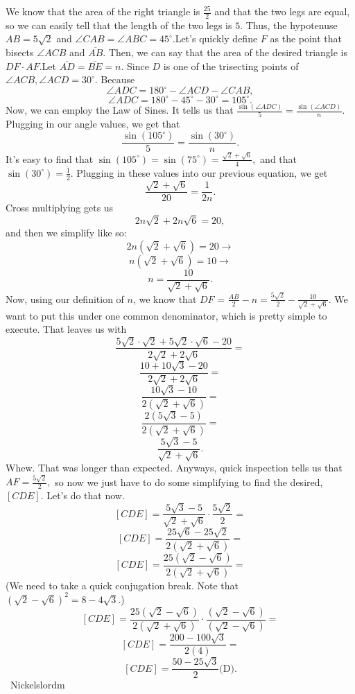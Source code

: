 \begin{enumerate}
We know that the area of the right triangle is $\frac{25}{2}$ and that the two legs are equal, so we can easily tell that the length of the two legs is $5$. Thus, the hypotenuse $AB = 5\sqrt{2}$ and $\angle{CAB} = \angle{ABC} = 45^{\circ}.$Let's quickly define $F$ as the point that bisects $\angle{ACB}$ and $\overline{AB}$. Then, we can say that the area of the desired triangle is $DF \cdot AF$.Let $\overline{AD} = \overline{BE} = n.$ Since $D$ is one of the trisecting points of $\angle{ACB}, \angle{ACD} = 30^{\circ}.$ Because 
 \[\angle{ADC} = 180^{\circ}-\angle{ACD}-\angle{CAB},\]
 \[\angle{ADC} = 180^{\circ} - 45^{\circ} - 30^{\circ} = 105^{\circ}.\]Now, we can employ the Law of Sines. It tells us that $\frac{\sin(\angle{ADC})}{5} = \frac{\sin(\angle{ACD})}{n}$. Plugging in our angle values, we get that 
 \[\frac{\sin(105^{\circ})}{5} = \frac{\sin(30^{\circ})}{n}.\] It's easy to find that $\sin(105^{\circ}) = \sin(75^{\circ}) = \frac{\sqrt{2}+\sqrt{6}}{4},$ and that $\sin(30^{\circ}) = \frac{1}{2}$. Plugging in these values into our previous equation, we get 
 \[\frac{\sqrt{2}+\sqrt{6}}{20} = \frac{1}{2n}.\] Cross multiplying gets us 
 \[2n\sqrt{2}+2n\sqrt{6} = 20,\] and then we simplify like so: 
 \[2n(\sqrt{2}+\sqrt{6}) = 20\rightarrow\]
 \[n(\sqrt{2}+\sqrt{6}) = 10\rightarrow\]
 \[n = \frac{10}{\sqrt{2}+\sqrt{6}}.\]Now, using our definition of $n$, we know that $DF$ = $\frac{AB}{2} - n = \frac{5\sqrt{2}}{2} - \frac{10}{\sqrt{2}+\sqrt{6}}$. We want to put this under one common denominator, which is pretty simple to execute. That leaves us with 
 \[\frac{5\sqrt{2} \cdot \sqrt{2}+5\sqrt{2} \cdot \sqrt{6} - 20}{2\sqrt{2} + 2\sqrt{6}}=\]
 \[\frac{10+10\sqrt{3} - 20}{2\sqrt{2} + 2\sqrt{6}}=\]
 \[\frac{10\sqrt{3} - 10}{2(\sqrt{2} + \sqrt{6})}=\]
 \[\frac{2(5\sqrt{3} - 5)}{2(\sqrt{2} + \sqrt{6})}=\]
 \[\frac{5\sqrt{3} - 5}{\sqrt{2} + \sqrt{6}}.\]Whew. That was longer than expected. Anyways, quick inspection tells us that $AF = \frac{5\sqrt{2}}{2},$ so now we just have to do some simplifying to find the desired, $[CDE]$. Let's do that now.
 \[[CDE] = \frac{5\sqrt{3} - 5}{\sqrt{2} + \sqrt{6}} \cdot \frac{5\sqrt{2}}{2}=\]
 \[[CDE] = \frac{25\sqrt{6} - 25\sqrt{2}}{2(\sqrt{2} + \sqrt{6})}=\]
 \[[CDE] = \frac{25(\sqrt{2} - \sqrt{6})}{2(\sqrt{2} + \sqrt{6})}=\](We need to take a quick conjugation break. Note that $(\sqrt{2} - \sqrt{6})^2 = 8 - 4\sqrt{3}.$)
 \[[CDE] = \frac{25(\sqrt{2} - \sqrt{6})}{2(\sqrt{2} + \sqrt{6})} \cdot \frac{(\sqrt{2} - \sqrt{6})}{(\sqrt{2} - \sqrt{6})}=\]
 \[[CDE] = \frac{200 - 100\sqrt{3}}{2(4)}=\]
 \[[CDE] =\boxed{\frac{50 - 25\sqrt{3}}{2} \text{(D)}.}\]~Nickelslordm


\end{enumerate}
